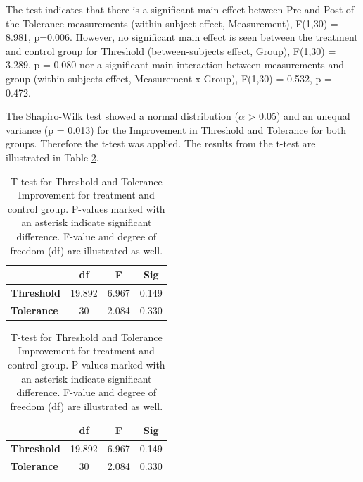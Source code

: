\noindent
The test indicates that there is a significant main effect between Pre and Post of the Tolerance measurements (within-subject effect, Measurement), F(1,30) = 8.981, p=0.006. However, no significant main effect is seen between the treatment and control group for Threshold (between-subjects effect, Group), F(1,30) = 3.289, p = 0.080 nor a significant main interaction between  measurements and group (within-subjects effect, Measurement x Group), F(1,30) = 0.532, p = 0.472.

The Shapiro-Wilk test showed a normal distribution ($\alpha$ > 0.05) and an unequal variance (p = 0.013) for the Improvement in Threshold and Tolerance for both groups. Therefore the t-test was applied. The results from the t-test are illustrated in Table \ref{table:TTEST}. 

\begin{table}[ht]
\caption{T-test for Threshold and Tolerance Improvement for treatment and control group. P-values marked with an asterisk indicate significant difference. F-value and degree of
freedom (df) are illustrated as well.}
\centering
\begin{tabular}{l c c c} 
\toprule
& \textbf{df} & \textbf{F} & \textbf{Sig} \\ [0.5ex]
\midrule 
\textbf{Threshold} & 19.892 & 6.967 & 0.149    \\ \hline
\textbf{Tolerance} & 30 & 2.084 & 0.330 \\
\hline
\end{tabular}
\label{table:TTEST}
\end{table}

\begin{table}[ht]
\caption{T-test for Threshold and Tolerance Improvement for treatment and control group. P-values marked with an asterisk indicate significant difference. F-value and degree of
freedom (df) are illustrated as well.}
\centering
\begin{tabular}{l c c c} 
\toprule
& \textbf{df} & \textbf{F} & \textbf{Sig} \\ [0.5ex]
\midrule 
\textbf{Threshold} & 19.892 & 6.967 & 0.149    \\ 
\textbf{Tolerance} & 30 & 2.084 & 0.330 \\
\hline
\end{tabular}
\label{table:TTEST}
\end{table}


